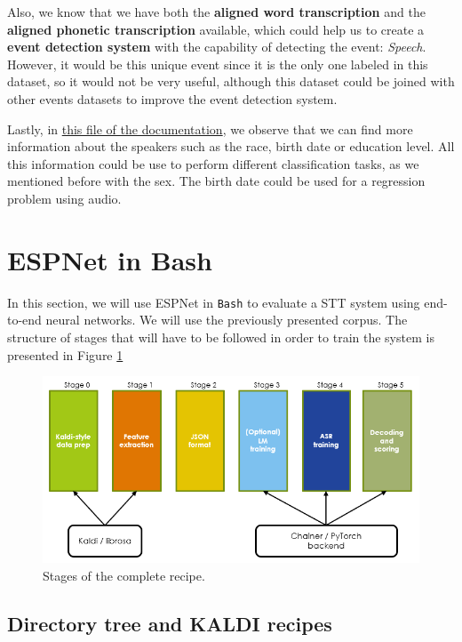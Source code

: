 \documentclass[a4paper]{article}
\def\inline{\lstinline[basicstyle=\ttfamily,keywordstyle={}]}
\begin{document}
\begin{itemize}
        Also, we know that we have both the \textbf{aligned word transcription} and the \textbf{aligned phonetic transcription} available, which could help us to create a \textbf{event detection system} with the capability of detecting the event: \emph{Speech}. However, it would be this unique event since it is the only one labeled in this dataset, so it would not be very useful, although this dataset could be joined with other events datasets to improve the event detection system.

        Lastly, in \href{https://catalog.ldc.upenn.edu/docs/LDC93S1/SPKRINFO.TXT}{this file of the documentation}, we observe that we can find more information about the speakers such as the race, birth date or education level. All this information could be use to perform different classification tasks, as we mentioned before with the sex. The birth date could be used for a regression problem using audio.
\end{itemize}

\section{ESPNet in Bash}

In this section, we will use ESPNet in \inline{Bash} to evaluate a STT system using end-to-end neural networks. We will use the previously presented corpus. The structure of stages that will have to be followed in order to train the system is presented in Figure \ref{fig:structure:stages}

\begin{figure}[H]
  \centering
  \includegraphics[scale=0.6]{Figures/stages}
  \caption{Stages of the complete recipe.}
  \label{fig:structure:stages}
\end{figure}

\subsection{Directory tree and KALDI recipes}
\end{document}
